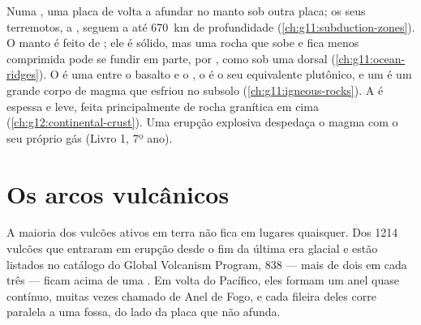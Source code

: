 \begin{recall}
Numa , uma placa de  volta a afundar no
manto sob outra placa; os seus terremotos, a , seguem
a  até \qty{670}{km} de profundidade (\cref{ch:g11:subduction-zones}). O
manto é feito de ; ele é sólido, mas uma rocha que sobe e fica
menos comprimida pode se fundir em parte, por , como
sob uma dorsal (\cref{ch:g11:ocean-ridges}). O  é uma   entre o basalto e o , o  é o seu
equivalente plutônico, e um  é um grande corpo de magma que esfriou
no subsolo (\cref{ch:g11:igneous-rocks}). A  é espessa e
leve, feita principalmente de rocha granítica em cima
(\cref{ch:g12:continental-crust}). Uma erupção explosiva despedaça o magma
com o seu próprio gás (Livro 1, 7º ano).
\end{recall}

\section{Os arcos vulcânicos}

A maioria dos vulcões ativos em terra não fica em lugares quaisquer. Dos
1214 vulcões que entraram em erupção desde o fim da última era glacial e
estão listados no catálogo do Global Volcanism Program, 838 --- mais de dois
em cada três --- ficam acima de uma . Em volta do Pacífico,
eles formam um anel quase contínuo, muitas vezes chamado de Anel de Fogo, e
cada fileira deles corre paralela a uma fossa, do lado da placa que não
afunda.

